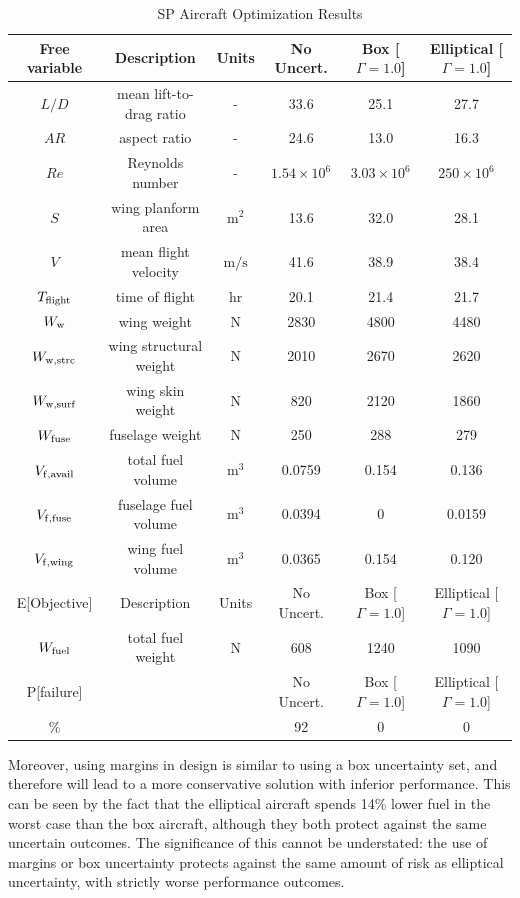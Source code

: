 \begin{table}[!h]
\begin{center}
\caption{\label{tab:results} SP Aircraft Optimization Results}
\begin{tabular}{c c c c c c}
\hline
Free variable & Description & Units & No Uncert. & Box [$\Gamma = 1.0$] & Elliptical [$\Gamma = 1.0$] \\
\hline
$L/D$ & mean lift-to-drag ratio & - & 33.6 & 25.1 & 27.7 \\
$AR$ & aspect ratio & - & 24.6 & 13.0 & 16.3 \\
$Re$ & Reynolds number & - & $1.54 \times 10^6$ & $3.03\times 10^6$ & $250 \times 10^6$ \\
$S$ & wing planform area &$\mathrm{m^2}$ & 13.6 & 32.0 & 28.1 \\
$V$ & mean flight velocity &$\mathrm{m/s}$ & 41.6 & 38.9 & 38.4 \\
$T_{\rm{flight}}$ & time of flight & $\mathrm{hr}$ & 20.1 & 21.4 & 21.7 \\
$W_{\rm{w}}$ & wing weight & $\mathrm{N}$ & 2830 & 4800 & 4480 \\
$W_{\rm{w,strc}}$ & wing structural weight &$\mathrm{N}$ & 2010 & 2670 & 2620 \\
$W_{\rm{w,surf}}$ & wing skin weight &$\mathrm{N}$ & 820 & 2120 & 1860 \\
$W_{\rm{fuse}}$ & fuselage weight &$\mathrm{N}$ & 250 & 288 & 279 \\
$V_{\rm{f,avail}}$ & total fuel volume & $\mathrm{m^3}$ & 0.0759 & 0.154 & 0.136 \\
$V_{\rm{f,fuse}}$ & fuselage fuel volume & $\mathrm{m^3}$ & 0.0394 & 0 & 0.0159 \\
$V_{\rm{f,wing}}$ & wing fuel volume &$\mathrm{m^3}$ & 0.0365 & 0.154 & 0.120    \\
\hline
E[Objective] & Description & Units & No Uncert. & Box [$\Gamma = 1.0$] & Elliptical [$\Gamma = 1.0$] \\
\hline
$W_{\rm{fuel}}$ & total fuel weight & $\mathrm{N}$ & 608 & 1240 & 1090 \\
\hline
P[failure] & & & No Uncert. & Box [$\Gamma = 1.0$] & Elliptical [$\Gamma = 1.0$] \\
\hline
\% & & & 92 & 0 & 0\\
\hline
\end{tabular}
\end{center}
\end{table}

Moreover, using margins in design is similar to using a box uncertainty set, and therefore will lead
to a more conservative solution with inferior performance. This can be seen by the fact that
the elliptical aircraft spends 14\% lower fuel in the worst case
than the box aircraft, although they both protect against the same uncertain outcomes.
The significance of this cannot be understated: the use of margins or box uncertainty protects
against the same amount of risk as elliptical uncertainty, with strictly worse performance outcomes.

